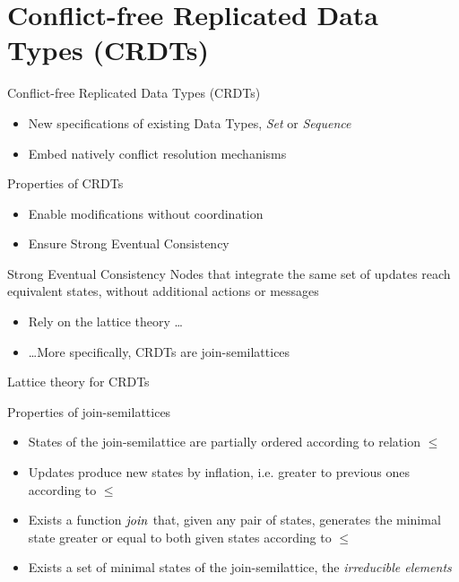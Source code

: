 \section{Conflict-free Replicated Data Types (CRDTs)}

\begin{frame}{Conflict-free Replicated Data Types (CRDTs)  \cite{shapiro_2011_crdt}}
    \begin{itemize}
        \item New specifications of existing Data Types, \eg \emph{Set} or \emph{Sequence}
        \item Embed natively conflict resolution mechanisms
    \end{itemize}
    \pause
    \begin{block}{Properties of CRDTs}
        \begin{itemize}
            \item Enable modifications \alert{without coordination}
            \item Ensure \alert{Strong Eventual Consistency}
        \end{itemize}
    \end{block}
    \pause
    \begin{block}{Strong Eventual Consistency}
        Nodes that integrate the same set of updates reach equivalent states, \alert{without additional actions or messages}
    \end{block}
    \pause
    \begin{itemize}
        \item Rely on the lattice theory \dots
        \item \dots More specifically, \alert{CRDTs are join-semilattices}
    \end{itemize}
\end{frame}

\begin{frame}{Lattice theory for CRDTs}

    \begin{block}{Properties of join-semilattices}
        \pause
        \begin{itemize}
            \item States of the join-semilattice are partially ordered according to relation $\leq$
            \pause
            \item Updates produce new states by inflation, i.e. greater to previous ones according to $\leq$
            \pause
            \item Exists a function $\mathit{join}$ that, given any pair of states, generates the minimal state greater or equal to both given states according to $\leq$
            \pause
            \item Exists a set of minimal states of the join-semilattice, the \emph{irreducible elements}
        \end{itemize}
    \end{block}
\end{frame}

